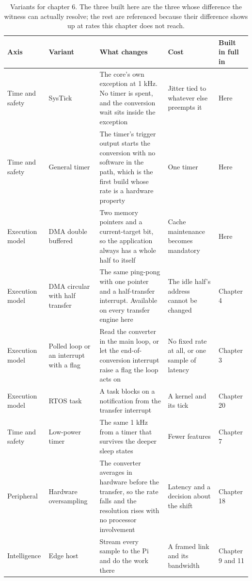 \begin{table}[H]\centering\small
\begin{tabular}{p{24mm}p{26mm}p{44mm}p{22mm}p{20mm}}
\toprule
Axis & Variant & What changes & Cost & Built in full in \\
\midrule
Time and safety & SysTick & The core's own exception at 1 kHz. No timer is spent, and the conversion wait sits inside the exception & Jitter tied to whatever else preempts it & Here \\
Time and safety & General timer & The timer's trigger output starts the conversion with no software in the path, which is the first build whose rate is a hardware property & One timer & Here \\
Execution model & DMA double buffered & Two memory pointers and a current-target bit, so the application always has a whole half to itself & Cache maintenance becomes mandatory & Here \\
Execution model & DMA circular with half transfer & The same ping-pong with one pointer and a half-transfer interrupt. Available on every transfer engine here & The idle half's address cannot be changed & Chapter 4 \\
Execution model & Polled loop or an interrupt with a flag & Read the converter in the main loop, or let the end-of-conversion interrupt raise a flag the loop acts on & No fixed rate at all, or one sample of latency & Chapter 3 \\
Execution model & RTOS task & A task blocks on a notification from the transfer interrupt & A kernel and its tick & Chapter 20 \\
Time and safety & Low-power timer & The same 1 kHz from a timer that survives the deeper sleep states & Fewer features & Chapter 7 \\
Peripheral & Hardware oversampling & The converter averages in hardware before the transfer, so the rate falls and the resolution rises with no processor involvement & Latency and a decision about the shift & Chapter 18 \\
Intelligence & Edge host & Stream every sample to the Pi and do the work there & A framed link and its bandwidth & Chapter 9 and 11 \\
\bottomrule
\end{tabular}
\caption{Variants for chapter 6. The three built here are the three whose difference the witness can actually resolve; the rest are referenced because their difference shows up at rates this chapter does not reach.}
\end{table}

